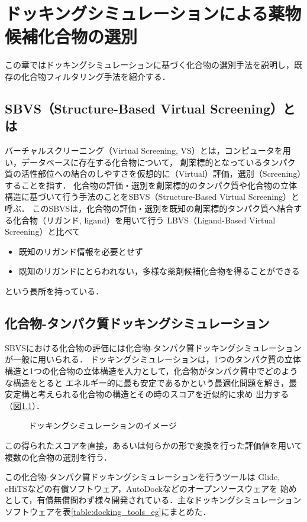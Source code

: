 \chapter{ドッキングシミュレーションによる薬物候補化合物の選別}
この章ではドッキングシミュレーションに基づく化合物の選別手法を説明し，既存の化合物フィルタリング手法を紹介する．

\section{SBVS（Structure-Based Virtual Screening）とは}
バーチャルスクリーニング（Virtual Screening, VS）とは，コンピュータを用い，データベースに存在する化合物について，
創薬標的となっているタンパク質の活性部位への結合のしやすさを仮想的に（Virtual）評価，選別（Screening）することを指す．
化合物の評価・選別を創薬標的のタンパク質や化合物の立体構造に基づいて行う手法のことをSBVS（Structure-Based Virtual Screening）と呼ぶ．
このSBVSは，化合物の評価・選別を既知の創薬標的タンパク質へ結合する化合物（リガンド, ligand）を用いて行う
LBVS（Ligand-Based Virtual Screening）と比べて
\begin{itemize}
\item 既知のリガンド情報を必要とせず
\item 既知のリガンドにとらわれない，多様な薬剤候補化合物を得ることができる
\end{itemize}
という長所を持っている．

\section{化合物-タンパク質ドッキングシミュレーション}
SBVSにおける化合物の評価には化合物-タンパク質ドッキングシミュレーションが一般に用いられる．
ドッキングシミュレーションは，1つのタンパク質の立体構造と1つの化合物の立体構造を入力として，化合物がタンパク質中でどのような構造をとると
エネルギー的に最も安定であるかという最適化問題を解き，最安定構と考えられる化合物の構造とその時のスコアを近似的に求め
出力する（図\ref{fig:docking}）．
\begin{figure}[tb]
 \begin{center}
  \caption{ドッキングシミュレーションのイメージ}
  \label{fig:docking}
 \end{center}
\end{figure}
この得られたスコアを直接，あるいは何らかの形で変換を行った評価値を用いて複数の化合物の選別を行う．

この化合物-タンパク質ドッキングシミュレーションを行うツールは
Glide\cite{Friesner2004}, eHiTS\cite{Zsoldos2007}などの有償ソフトウェア，AutoDock\cite{Morris2009}などのオープンソースウェアを
始めとして，有償無償問わず様々開発されている．主なドッキングシミュレーションソフトウェアを表\ref{table:docking_tools_eg}にまとめた．

